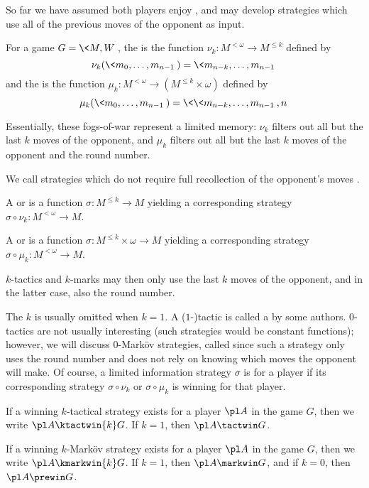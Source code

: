 So far we have assumed both players enjoy , and
may develop strategies which use all of the previous moves of the opponent
as input.

\begin{defn}
  For a game $G=\<M,W\>$, the  is the function
  $\nu_k:M^{<\omega}\to M^{\leq k}$ defined by
    \[
      \nu_k(\<m_0,\dots,m_{n-1}\>)=\<m_{n-k},\dots,m_{n-1}\>
    \]
  and the  is the function
  $\mu_k:M^{<\omega}\to (M^{\leq k}\times\omega)$ defined by
    \[
      \mu_k(\<m_0,\dots,m_{n-1}\>)=\<\<m_{n-k},\dots,m_{n-1}\>,n\>
    \]
\end{defn}

Essentially, these fogs-of-war represent a limited memory: $\nu_k$ filters out
all but the last $k$ moves of the opponent, and $\mu_k$ filters out all but
the last $k$ moves of the opponent and the round number.

We call strategies which do not require full recollection of the opponent's
moves .

\begin{defn}
  A  or  is a function
  $\sigma:M^{\leq k}\to M$ yielding a corresponding strategy
  $\sigma\circ\nu_k:M^{<\omega}\to M$.

  A  or  is a function
  $\sigma:M^{\leq k}\times\omega\to M$ yielding a corresponding strategy
  $\sigma\circ\mu_k:M^{<\omega}\to M$.
\end{defn}

$k$-tactics and $k$-marks may then only use the last $k$ moves of the opponent,
and in the latter case, also the round number.

The $k$ is usually omitted when $k=1$. A ($1$-)tactic is
called a  by some authors. $0$-tactics are not
usually interesting (such strategies would be constant functions); however,
we will discuss $0$-Mark\"ov strategies, called
 since such a strategy only uses the round
number and does not rely on knowing which moves the opponent will make.
Of course, a limited information strategy $\sigma$ is  for a
player if its corresponding strategy $\sigma\circ\nu_k$ or $\sigma\circ\mu_k$
is winning for that player.

\begin{defn}
  If a winning $k$-tactical strategy exists for a player $\pl A$ in the game
  $G$, then we write $\pl A \ktactwin{k} G$. If $k=1$, then $\pl A \tactwin G$.

  If a winning $k$-Mark\"ov strategy exists for a player $\pl A$ in the game
  $G$, then we write $\pl A \kmarkwin{k} G$. If $k=1$, then $\pl A \markwin G$,
  and if $k=0$, then $\pl A \prewin G$.
\end{defn}

